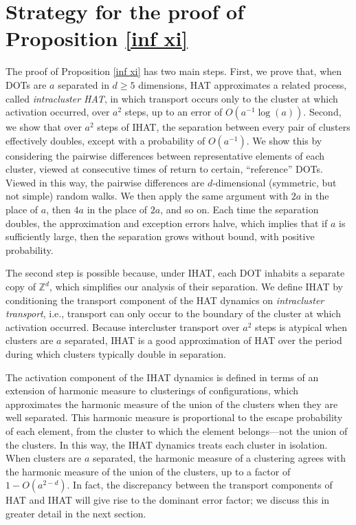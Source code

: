 \documentclass[11pt,reqno]{amsart}
\theoremstyle{definition}
\numberwithin{equation}{section}
\newcommand{\Z}{\mathbb{Z}}
\newcommand{\1}{\mathbf{1}}
\begin{document}
\section{Strategy for the proof of Proposition \ref{inf xi}}\label{strat}


The proof of Proposition \ref{inf xi} has two main steps. First, we prove that, when DOTs are $a$ separated in $d \geq 5$ dimensions, HAT approximates a related process, called {\em intracluster HAT}, in which transport occurs only to the cluster at which activation occurred, over $a^2$ steps, up to an error of $O(a^{-1} \log (a))$. Second, we show that over $a^2$ steps of IHAT, the separation between every pair of clusters effectively doubles, except with a probability of $O(a^{-1})$. We show this by considering the pairwise differences between representative elements of each cluster, viewed at consecutive times of return to certain, ``reference'' DOTs. Viewed in this way, the pairwise differences are $d$-dimensional (symmetric, but not simple) random walks. 
We then apply the same argument with $2a$ in the place of $a$, then $4a$ in the place of $2a$, and so on. Each time the separation doubles, the approximation and exception errors halve, which implies that if $a$ is sufficiently large, then the separation grows without bound, with positive probability.

The second step is possible because, under IHAT, each DOT inhabits a separate copy of $\Z^d$, which simplifies our analysis of their separation. We define IHAT by conditioning the transport component of the HAT dynamics on {\em intracluster transport}, i.e., transport can only occur to the boundary of the cluster at which activation occurred. Because intercluster transport over $a^2$ steps is atypical when clusters are $a$ separated, IHAT is a good approximation of HAT over the period during which clusters typically double in separation.

The activation component of the IHAT dynamics is defined in terms of an extension of harmonic measure to clusterings of configurations, which approximates the harmonic measure of the union of the clusters when they are well separated. This harmonic measure is proportional to the escape probability of each element, from the cluster to which the element belongs---not the union of the clusters. In this way, the IHAT dynamics treats each cluster in isolation. When clusters are $a$ separated, the harmonic measure of a clustering agrees with the harmonic measure of the union of the clusters, up to a factor of $1 - O(a^{2-d})$. In fact, the discrepancy between the transport components of HAT and IHAT will give rise to the dominant error factor; we discuss this in greater detail in the next section.
\end{document}
